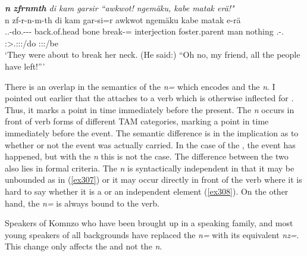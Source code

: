 \begin{exe}
	\ex \emph{\textbf{n} \textbf{zfrnmth} di kam garsir ``awkwot! ngemäku, kabe matak erä!"}\\
	\glll n zf-r-n-m-th di kam gar-si=r awkwot ngemäku\footnotemark{} kabe matak e-rä\\
	\Imn{} \Tsg.\F.\Betatwo-do.\Ext-\Du-\Dur-\Stnsg{} back.of.head bone break-\Nmlz=\Purp{} interjection foster.parent man nothing \Stnsg.\Alph-\Cop.\Ndu\\
	{} \footnotesize{\Stdu:\Sbj>\Tsg.\F:\Obj:\Pst:\Dur/do} {} {} {} {} {} {} {} \footnotesize{\Stpl:\Sbj:\Nonpast:\Ipfv/be}\\
	\trans `They were about to break her neck. (He said:) ``Oh no, my friend, all the people have left!'''
	\label{ex308}
\end{exe}

There is an overlap in the semantics of the  \emph{n=} which encodes  and the   \emph{n}. I pointed out earlier that the   attaches to a verb which is otherwise inflected for . Thus, it marks a point in time immediately before the present. The  \emph{n} occurs in front of verb forms of different TAM categories, marking a point in time immediately before the event. The semantic difference is in the implication as to whether or not the event was actually carried. In the case of the  , the event has happened, but with the  \emph{n} this is not the case. The difference between the two also lies in formal criteria. The  \emph{n} is syntactically independent in that it may be unbounded as in (\ref{ex307}) or it may occur directly in front of the verb where it is hard to say whether it is a  or an independent element (\ref{ex308}). On the other hand, the   \emph{n=} is always bound to the verb.%

Speakers of Komnzo who have been brought up in a  speaking family, and most young speakers of all backgrounds have replaced the   \emph{n=} with its  equivalent \emph{nz=}. This change only affects the  and not the   \emph{n}.

